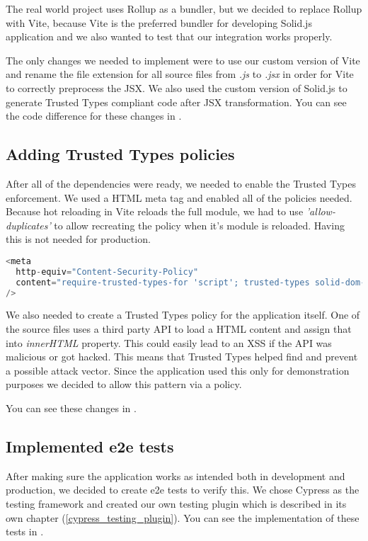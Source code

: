 The real world project uses Rollup as a bundler, but we decided to replace Rollup with Vite,
because Vite is the preferred bundler for developing Solid.js application and we also wanted to test
that our integration works properly.

The only changes we needed to implement were to use our custom version of Vite and rename the file
extension for all source files from \emph{.js} to \emph{.jsx} in order for Vite to correctly
preprocess the JSX. We also used the custom version of Solid.js to generate Trusted Types compliant
code after JSX transformation. You can see the code difference for these changes in
\cite{solid_realworld_project:vite}.

\subsection{Adding Trusted Types policies}

After all of the dependencies were ready, we needed to enable the Trusted Types enforcement. We used
a HTML meta tag and enabled all of the policies needed. Because hot reloading in Vite reloads the
full module, we had to use \textit{'allow-duplicates'} to allow recreating the policy when it's
module is reloaded. Having this is not needed for production.

\bigskip
\begin{lstlisting}[language=JavaScript, caption=Creation of style elements using innerHTML in Vite \cite{commit_vite_inner_html_styles}]
<meta
  http-equiv="Content-Security-Policy"
  content="require-trusted-types-for 'script'; trusted-types solid-dom-expressions trusted-article vite-overlay 'allow-duplicates';"
/>
\end{lstlisting}

We also needed to create a Trusted Types policy for the application itself. One of the source files
uses a third party API to load a HTML content and assign that into \emph{innerHTML} property. This
could easily lead to an XSS if the API was malicious or got hacked. This means that Trusted Types
helped find and prevent a possible attack vector. Since the application used this only for
demonstration purposes we decided to allow this pattern via a policy.

You can see these changes in \cite{solid_realworld_project:tt_policy}.

\subsection{Implemented e2e tests}

After making sure the application works as intended both in development and production, we decided
to create e2e tests to verify this. We chose Cypress as the testing framework and created our own
testing plugin which is described in its own chapter (\ref{cypress_testing_plugin}). You can see the
implementation of these tests in \cite{solid_realworld_project:tests}.
